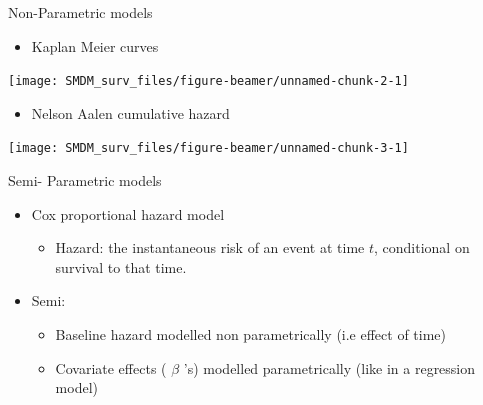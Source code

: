 \documentclass[
  ignorenonframetext,
]{beamer}
\providecommand{\tightlist}{%
  \setlength{\itemsep}{0pt}\setlength{\parskip}{0pt}}
\begin{document}
\begin{frame}{Non-Parametric models}
\protect\hypertarget{non-parametric-models}{}

\begin{itemize}
\tightlist
\item
  Kaplan Meier curves
\end{itemize}

\texttt{[image: SMDM\_surv\_files/figure-beamer/unnamed-chunk-2-1]}

\end{frame}

\begin{frame}

\begin{itemize}
\tightlist
\item
  Nelson Aalen cumulative hazard
\end{itemize}

\texttt{[image: SMDM\_surv\_files/figure-beamer/unnamed-chunk-3-1]}

\end{frame}

\begin{frame}{Semi- Parametric models}
\protect\hypertarget{semi--parametric-models}{}

\begin{itemize}
\tightlist
\item
  Cox proportional hazard model

  \begin{itemize}
  \tightlist
  \item
    Hazard: the instantaneous risk of an event at time \(t\),
    conditional on survival to that time.
  \end{itemize}
\item
  Semi:

  \begin{itemize}
  \tightlist
  \item
    Baseline hazard modelled non parametrically (i.e effect of time)
  \item
    Covariate effects ( \(\beta\) 's) modelled parametrically (like in a
    regression model)
  \end{itemize}
\end{itemize}

\end{frame}
\end{document}
